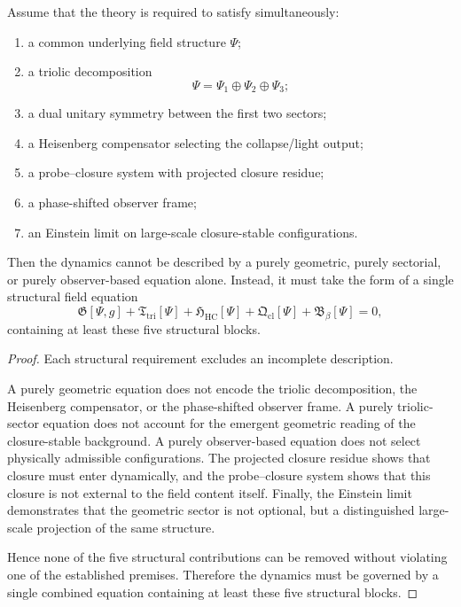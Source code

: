 \begin{theorem}
\label{thm:toe_master_necessity}
Assume that the theory is required to satisfy simultaneously:
\begin{enumerate}
\item a common underlying field structure $\Psi$;
\item a triolic decomposition
\[
\Psi=\Psi_1\oplus\Psi_2\oplus\Psi_3;
\]
\item a dual unitary symmetry between the first two sectors;
\item a Heisenberg compensator selecting the collapse/light output;
\item a probe--closure system with projected closure residue;
\item a phase-shifted observer frame;
\item an Einstein limit on large-scale closure-stable configurations.
\end{enumerate}
Then the dynamics cannot be described by a purely geometric, purely sectorial,
or purely observer-based equation alone. Instead, it must take the form of a
single structural field equation
\[
\mathfrak G[\Psi,g]
+\mathfrak T_{\mathrm{tri}}[\Psi]
+\mathfrak H_{\mathrm{HC}}[\Psi]
+\mathfrak Q_{\mathrm{cl}}[\Psi]
+\mathfrak B_{\beta}[\Psi]
=0,
\]
containing at least these five structural blocks.
\end{theorem}

\begin{proof}
Each structural requirement excludes an incomplete description.

A purely geometric equation does not encode the triolic decomposition, the
Heisenberg compensator, or the phase-shifted observer frame. A purely
triolic-sector equation does not account for the emergent geometric reading of
the closure-stable background. A purely observer-based equation does not
select physically admissible configurations. The projected closure residue
shows that closure must enter dynamically, and the probe--closure system shows
that this closure is not external to the field content itself. Finally, the
Einstein limit demonstrates that the geometric sector is not optional, but a
distinguished large-scale projection of the same structure.

Hence none of the five structural contributions can be removed without
violating one of the established premises. Therefore the dynamics must be
governed by a single combined equation containing at least these five
structural blocks.
\end{proof}

